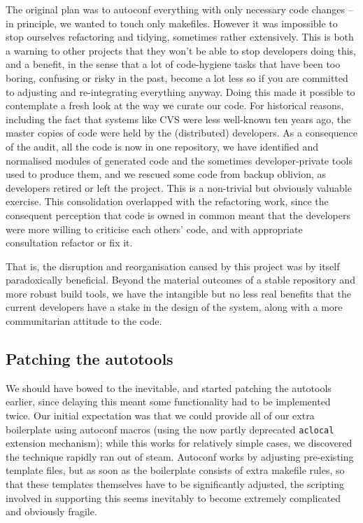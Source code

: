 \documentclass{speauth}
\begin{document}
The original plan was to autoconf everything with only necessary code
changes -- in principle, we wanted to touch only makefiles.  However
it was impossible to stop ourselves refactoring and tidying, sometimes
rather extensively.  This is both a warning to other projects that
they won't be able to stop developers doing this, and a benefit, in
the sense that a lot of code-hygiene tasks that have been too boring,
confusing or risky in the past, become a lot less so if you are
committed to adjusting and re-integrating everything anyway.  Doing
this made it possible to contemplate a fresh look at the way we curate
our code.  For historical reasons, including the fact that systems
like CVS were less well-known ten years ago, the master copies of code
were held by the (distributed) developers.  As a consequence of the
audit, all the code is now in one repository, we have identified and
normalised modules of generated code and the sometimes
developer-private tools used to produce them, and we rescued some code
from backup oblivion, as developers retired or left the project.  This
is a non-trivial but obviously valuable exercise.  This consolidation
overlapped with the refactoring work, since the consequent perception
that code is owned in common meant that the developers were more
willing to criticise each others' code, and with appropriate
consultation refactor or fix it.

That is, the disruption and reorganisation caused by this project was
by itself paradoxically beneficial.  Beyond the material outcomes of a
stable repository and more robust build tools, we have the intangible
but no less real benefits that the current developers have a stake in
the design of the system, along with a more communitarian attitude to
the code.

\subsection{Patching the autotools}

We should have bowed to the inevitable, and started patching the
autotools earlier, since delaying this meant some functionality had to
be implemented twice.  Our initial expectation was that we could
provide all of our extra boilerplate using autoconf macros (using the
now partly deprecated \texttt{aclocal} extension mechanism); while
this works for relatively simple cases, we discovered the technique
rapidly ran out of steam.  Autoconf
works by adjusting pre-existing template files, but as soon as the
boilerplate consists of extra makefile rules, so that these templates
themselves have to be significantly adjusted, the scripting involved
in supporting this seems inevitably to become extremely complicated
and obviously fragile.
\end{document}
